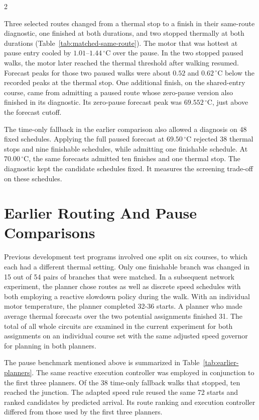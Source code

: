 \documentclass{ieeeaccess}
\begin{document}
\begin{multicols}{2}
\raggedcolumns

Three selected routes changed from a thermal stop to a finish in their same-route diagnostic, one finished at both durations, and two stopped thermally at both durations (Table~\ref{tab:matched-same-route}). The motor that was hottest at pause entry cooled by $1.01$--$1.44\,{}^\circ\mathrm{C}$ over the pause. In the two stopped paused walks, the motor later reached the thermal threshold after walking resumed. Forecast peaks for those two paused walks were about $0.52$ and $0.62\,{}^\circ\mathrm{C}$ below the recorded peaks at the thermal stop. One additional finish, on the shared-entry course, came from admitting a paused route whose zero-pause version also finished in its diagnostic. Its zero-pause forecast peak was $69.552\,{}^\circ\mathrm{C}$, just above the forecast cutoff.

The time-only fallback in the earlier comparison also allowed a diagnosis on 48 fixed schedules. Applying the full paused forecast at $69.50\,{}^\circ\mathrm{C}$ rejected 38 thermal stops and nine finishable schedules, while admitting one finishable schedule. At $70.00\,{}^\circ\mathrm{C}$, the same forecasts admitted ten finishes and one thermal stop. The diagnostic kept the candidate schedules fixed. It measures the screening trade-off on these schedules.

\columnbreak
\section{Earlier Routing And Pause Comparisons}
\label{app:earlier-benchmark}

Previous development test programs involved one split on six courses, to which each had a different thermal setting. Only one finishable branch was changed in 15 out of 54 pairs of branches that were matched. In a subsequent network experiment, the planner chose routes as well as discrete speed schedules with both employing a reactive slowdown policy during the walk. With an individual motor temperature, the planner completed 32-36 starts. A planner who made average thermal forecasts over the two potential assignments finished 31. The total of all whole circuits are examined in the current experiment for both assignments on an individual course set with the same adjusted speed governor for planning in both planners.

The pause benchmark mentioned above is summarized in Table~\ref{tab:earlier-planners}. The same reactive execution controller was employed in conjunction to the first three planners. Of the 38 time-only fallback walks that stopped, ten reached the junction. The adapted speed rule reused the same 72 starts and ranked candidates by predicted arrival. Its route ranking and execution controller differed from those used by the first three planners.


\end{multicols}
\end{document}
